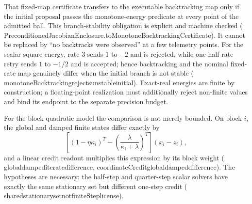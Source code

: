\documentclass[11pt]{article}
\newcommand{\leanname}[1]{{\scriptsize\ttfamily
  \def\_{\textunderscore\allowbreak}#1}}
\begin{document}
That fixed-map certificate transfers to the executable backtracking map only if the
initial proposal passes the monotone-energy predicate at every point of the admitted
ball. This branch-stability obligation is explicit and machine checked
(\leanname{PreconditionedJacobianEnclosure.\allowbreak{}toMonotoneBacktrackingCertificate}). It cannot
be replaced by ``no backtracks were observed'' at a few telemetry points. For the scalar
square energy, rate $3$ sends $1$ to $-2$ and is rejected, while one half-rate retry sends
$1$ to $-1/2$ and is accepted; hence backtracking and the nominal fixed-rate map genuinely
differ when the initial branch is not stable
(\leanname{monotoneBacktracking\_rejects\_unstable\_initial}). Exact-real energies are
finite by construction; a floating-point realization must additionally reject non-finite
values and bind its endpoint to the separate precision budget.

For the block-quadratic model the comparison is not merely bounded. On block $i$, the
global and damped finite states differ exactly by
\[
 \left[
 (1-\eta\kappa_i)^T-
 \left(\frac{\lambda}{\kappa_i+\lambda}\right)^T
 \right](x_i-z_i),
\]
and a linear credit readout multiplies this expression by its block weight
(\leanname{global\_damped\_iterate\_difference},
\leanname{coordinateCredit\_global\_damped\_difference}). The hypotheses are necessary:
the half-step and quarter-step scalar solvers have exactly the same stationary set but
different one-step credit
(\leanname{shared\_stationary\_set\_not\_finiteStep\_license}).
\end{document}
